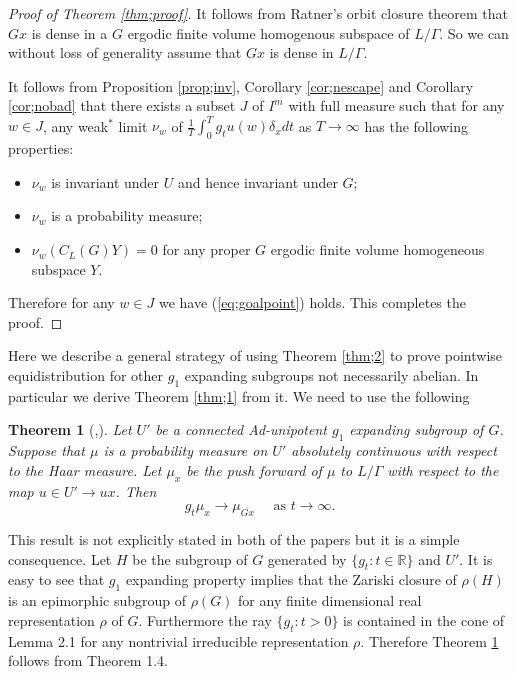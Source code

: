 \documentclass[12pt]{amsart}
\newtheorem{thm}{Theorem}[section]
\theoremstyle{definition}
\theoremstyle{remark}
\numberwithin{equation}{section}
\begin{document}
\begin{proof}[Proof of Theorem \ref{thm;proof}]
It follows from  Ratner's  orbit closure  theorem \cite{r912} that  $Gx$ 
is dense in a $G$ ergodic finite volume homogenous subspace of $L/\Gamma$.
So we can without loss of generality assume that 
$Gx$ is dense in $L/\Gamma$. 
  
It follows from Proposition \ref{prop;inv}, Corollary  \ref{cor;nescape}  and Corollary 
\ref{cor;nobad} that there exists a  subset  $J$ of $I^m$ with full measure such that  for
any $w\in J$,  any weak$^*$ limit $\nu_w$ of 
$\frac{1}{T}\int_0^T g_tu(w)\delta_xdt$ 
  as $T\to \infty$ has the following properties: 
\begin{itemize}
\item $\nu_w$ is invariant under $U$ and hence invariant under $G$;
\item $\nu_w$ is a probability measure;
\item $\nu_w(C_L(G)Y)=0$ for any proper $G$ ergodic  finite volume homogeneous subspace $Y$.
\end{itemize}
Therefore for any $w\in J$ we have (\ref{eq;goalpoint})
holds. This completes the proof.
\end{proof}

Here  we describe a general strategy of using Theorem \ref{thm;2} to prove 
pointwise equidistribution for other $g_1$ expanding subgroups not necessarily abelian.  In particular we derive 
Theorem \ref{thm;1} from it.  We need to use the following 
\begin{thm}[\cite{s96},\cite{sw96}]\label{thm;old}
Let $U'$ be a connected Ad-unipotent $ g_1 $ expanding subgroup of $G$. Suppose that $\mu$ is a
probability measure on $U'$ absolutely continuous with respect to the Haar measure. 
Let $\mu_ x$ be the push forward of $\mu$ to $L/\Gamma$
with respect to the map $u\in U'\to ux$.
Then 
\[
g_t \mu_ x\to \mu_{\overline{Gx}} \quad \mbox{ as } t \to \infty.
\] 
\end{thm}
This result is not explicitly stated in both of the papers but it is a simple consequence.
Let $H$ be the subgroup of $G$ generated by $\{g_t: t\in \mathbb R\}$ and $U'$.
It is easy to see that $g_1$ expanding property implies that the Zariski closure of $\rho(H)$ is 
an epimorphic subgroup of $\rho(G)$ for any finite dimensional real representation $\rho$ of 
$G$. Furthermore the ray $\{g_t: t>0\}$ is contained in the cone of \cite{sw96} Lemma 2.1 for any
nontrivial 
irreducible representation $\rho$. Therefore Theorem \ref{thm;old} follows from \cite{sw96} Theorem 1.4.
\end{document}
